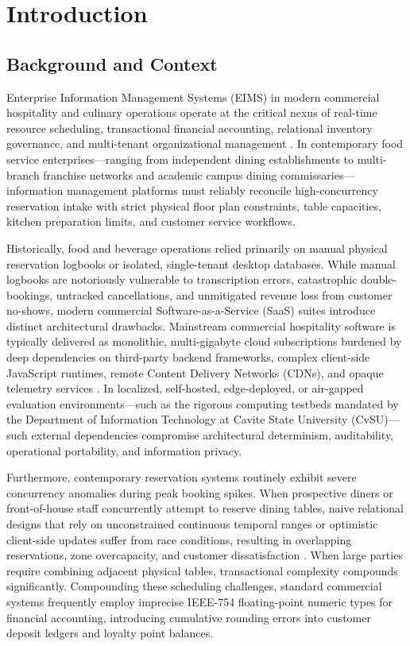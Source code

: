 \chapter{Introduction}
\label{chap:introduction}

\section{Background and Context}
\label{sec:intro_background}
Enterprise Information Management Systems (EIMS) in modern commercial hospitality and culinary operations operate at the critical nexus of real-time resource scheduling, transactional financial accounting, relational inventory governance, and multi-tenant organizational management \parencite{fowler2002patterns, chong2006multi}. In contemporary food service enterprises---ranging from independent dining establishments to multi-branch franchise networks and academic campus dining commissaries---information management platforms must reliably reconcile high-concurrency reservation intake with strict physical floor plan constraints, table capacities, kitchen preparation limits, and customer service workflows.

Historically, food and beverage operations relied primarily on manual physical reservation logbooks or isolated, single-tenant desktop databases. While manual logbooks are notoriously vulnerable to transcription errors, catastrophic double-bookings, untracked cancellations, and unmitigated revenue loss from customer no-shows, modern commercial Software-as-a-Service (SaaS) suites introduce distinct architectural drawbacks. Mainstream commercial hospitality software is typically delivered as monolithic, multi-gigabyte cloud subscriptions burdened by deep dependencies on third-party backend frameworks, complex client-side JavaScript runtimes, remote Content Delivery Networks (CDNs), and opaque telemetry services \parencite{stonebraker2007end, bezemer2010multitenant}. In localized, self-hosted, edge-deployed, or air-gapped evaluation environments---such as the rigorous computing testbeds mandated by the Department of Information Technology at Cavite State University (CvSU)---such external dependencies compromise architectural determinism, auditability, operational portability, and information privacy.

Furthermore, contemporary reservation systems routinely exhibit severe concurrency anomalies during peak booking spikes. When prospective diners or front-of-house staff concurrently attempt to reserve dining tables, naive relational designs that rely on unconstrained continuous temporal ranges or optimistic client-side updates suffer from race conditions, resulting in overlapping reservations, zone overcapacity, and customer dissatisfaction \parencite{bernstein1987concurrency, kung1981optimistic}. When large parties require combining adjacent physical tables, transactional complexity compounds significantly. Compounding these scheduling challenges, standard commercial systems frequently employ imprecise IEEE-754 floating-point numeric types for financial accounting, introducing cumulative rounding errors into customer deposit ledgers and loyalty point balances.


